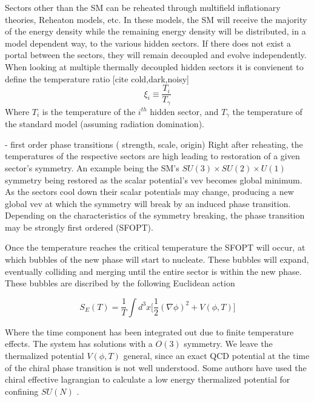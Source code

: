 \documentclass[nofootinbib,twocolumn,preprintnumbers]{revtex4-1}
\begin{document}
\label{sec:gw}
Sectors other than the SM can be reheated through multifield inflationary theories, Reheaton models, etc. In these models, the SM will receive the majority of the energy density while the remaining energy density will be distributed, in a model dependent way, to the various hidden sectors. If there does not exist a portal between the sectors, they will remain decoupled and evolve independently. When looking at multiple thermally decoupled hidden sectors it is convienent to define the temperature ratio [cite cold,dark,noisy]
\begin{equation}
\xi_i \equiv  \frac{T_{i}}{T_{\gamma}}
\end{equation}
Where $T_{i}$ is the temperature of the $i^{th}$ hidden sector, and $T_{\gamma}$ the temperature of the standard model (assuming radiation domination).

\vspace{1em }
- first order phase transitions ( strength, scale, origin)
Right after reheating, the temperatures of the respective sectors are high leading to restoration of a given sector's symmetry.  An example being the SM's $SU(3) \times SU(2) \times U(1)$ symmetry being restored as the scalar potential's vev becomes global minimum. As the sectors cool down their scalar potentials may change, producing a new global vev at which the symmetry will break by an induced phase transition. Depending on the characteristics of the symmetry breaking, the phase transition may be strongly first ordered (SFOPT).  

Once the temperature reaches the critical temperature the SFOPT will occur, at which bubbles of the new phase will start to nucleate. These bubbles will expand, eventually colliding and merging until the entire sector is within the new phase.  These bubbles are discribed by the following Euclidean action

\begin{equation}
S_{E}(T) = \frac{1}{T}\int d^3x \bigg[\frac{1}{2}(\nabla\phi)^2 + V(\phi,T)  \bigg]
\end{equation}

Where the time component has been integrated out due to finite temperature effects. The system has solutions with a $O(3)$ symmetry. We leave the thermalized potential $V(\phi, T)$ general, since an exact QCD potential at the time of the chiral phase transition is not well understood. Some authors have used the chiral effective lagrangian to calculate a low energy thermalized potential for confining $SU(N)$ .
\end{document}
